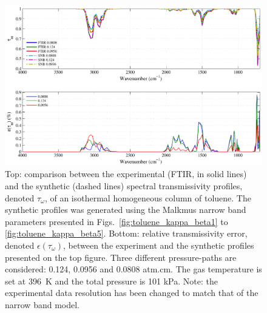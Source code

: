 \begin{figure}[p]
\includegraphics[width=\textwidth]{Figures/Comparison_Fit_Toluene_MALKMUS_Temp396K.pdf}
\caption{Top: comparison between the experimental (FTIR, in solid lines) and the synthetic (dashed lines) spectral transmissivity profiles, denoted $\tau_{\omega}$, of an isothermal homogeneous column of toluene. The synthetic profiles was generated using the Malkmus narrow band parameters presented in Figs.~\ref{fig:toluene_kappa_beta1} to \ref{fig:toluene_kappa_beta5}. Bottom: relative transmissivity error, denoted $\epsilon{(\tau_{\omega})}$, between the experiment and the synthetic profiles presented on the top figure. Three different pressure-paths are considered: 0.124, 0.0956 and 0.0808 atm.cm. The gas temperature is set at 396~K and the total pressure is 101 kPa. Note: the experimental data resolution has been changed to match that of the narrow band model. \label{fig:toluene_SNBVerify_396K}}
\end{figure}

